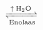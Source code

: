 \documentclass[preview]{standalone}
\begin{document}
\begin{align*}
\xrightleftharpoons[\text{Enolaas}]{\uparrow\: \text{H}_2\text{O}}
\end{align*}
\end{document}

